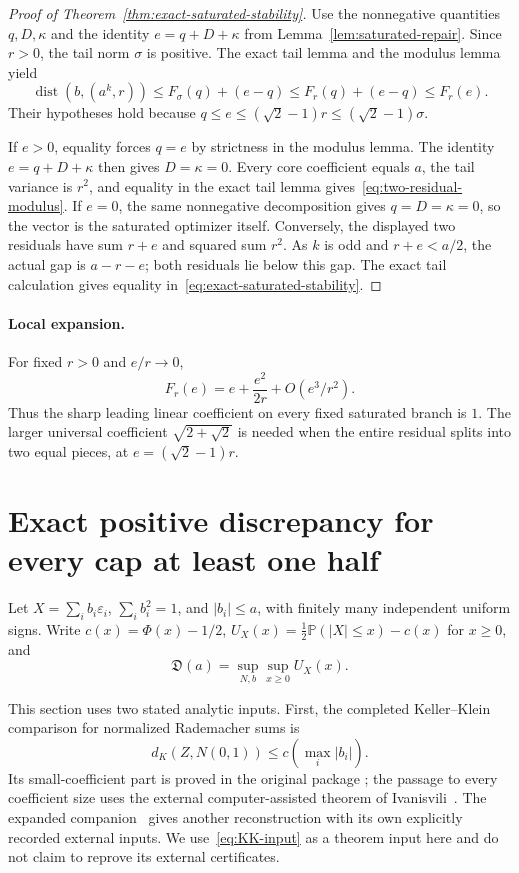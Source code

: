 \documentclass[11pt]{article}
\theoremstyle{remark}\newtheorem{remark}[theorem]{Remark}
\newcommand{\Pp}{\mathbb P}
\begin{document}
\begin{proof}[Proof of Theorem~\ref{thm:exact-saturated-stability}]

Use the nonnegative quantities $q,D,\kappa$ and the identity
$e=q+D+\kappa$ from Lemma~\ref{lem:saturated-repair}. Since $r>0$,
the tail norm $\sigma$ is positive. The exact tail lemma and the modulus
lemma yield
\[
 \operatorname{dist}(b,(a^k,r))
 \le F_\sigma(q)+(e-q)
 \le F_r(q)+(e-q)\le F_r(e).
\]
Their hypotheses hold because
$q\le e\le(\sqrt2-1)r\le(\sqrt2-1)\sigma$.

If $e>0$, equality forces $q=e$ by strictness in the modulus lemma.
The identity $e=q+D+\kappa$ then gives $D=\kappa=0$.
Every core coefficient equals $a$, the tail variance is $r^2$, and
equality in the exact tail lemma gives~\eqref{eq:two-residual-modulus}.
If $e=0$, the same nonnegative decomposition gives $q=D=\kappa=0$,
so the vector is the saturated optimizer itself.
Conversely, the displayed two residuals have sum $r+e$ and squared sum
$r^2$. As $k$ is odd and $r+e<a/2$, the actual gap is $a-r-e$;
both residuals lie below this gap. The exact tail calculation gives
equality in~\eqref{eq:exact-saturated-stability}.
\end{proof}

\paragraph{Local expansion.}
For fixed $r>0$ and $e/r\to0$,
\[
 F_r(e)=e+\frac{e^2}{2r}+O(e^3/r^2).
\]
Thus the sharp leading linear coefficient on every fixed saturated
branch is $1$. The larger universal coefficient
$\sqrt{2+\sqrt2}$ is needed when the entire residual splits into two
equal pieces, at $e=(\sqrt2-1)r$.

\section{Exact positive discrepancy for every cap at least one half}\label{sec:positive}

Let $X=\sum_i b_i\varepsilon_i$, $\sum_i b_i^2=1$, and $|b_i|\le a$,
with finitely many independent uniform signs. Write $c(x)=\Phi(x)-1/2$,
$U_X(x)=\frac12\Pp(|X|\le x)-c(x)$ for $x\ge0$, and
\[
 \mathfrak D(a)=\sup_{N,b}\sup_{x\ge0}U_X(x).
\]

This section uses two stated analytic inputs. First, the completed
Keller--Klein comparison for normalized Rademacher sums is
\begin{equation}\label{eq:KK-input}
 d_K(Z,N(0,1))\le c\!\left(\max_i|b_i|\right).
\end{equation}
Its small-coefficient part is proved in the original package
\cite{Original}; the passage to every coefficient size uses the external
computer-assisted theorem of Ivanisvili~\cite{Ivanisvili}. The expanded
companion~\cite{Prior} gives another reconstruction with its own
explicitly recorded external inputs. We use~\eqref{eq:KK-input} as a
theorem input here and do not claim to reprove its external certificates.
\end{document}

